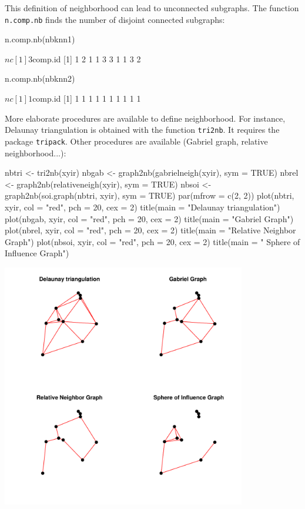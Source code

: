 \documentclass[a4paper]{article}
\begin{document}
This definition of neighborhood can lead to unconnected subgraphs. The function \texttt{n.comp.nb} finds the number of disjoint connected subgraphs:
\begin{Schunk}
\begin{Sinput}
 n.comp.nb(nbknn1)
\end{Sinput}
\begin{Soutput}
$nc
[1] 3

$comp.id
 [1] 1 2 1 1 3 3 1 1 3 2
\end{Soutput}
\begin{Sinput}
 n.comp.nb(nbknn2)
\end{Sinput}
\begin{Soutput}
$nc
[1] 1

$comp.id
 [1] 1 1 1 1 1 1 1 1 1 1
\end{Soutput}
\end{Schunk}

More elaborate procedures are available to define neighborhood. For instance, Delaunay triangulation is obtained with the function \texttt{tri2nb}. It requires the package \texttt{tripack}. Other procedures are available (Gabriel graph, relative neighborhood...):
\begin{Schunk}
\begin{Sinput}
 nbtri <- tri2nb(xyir)
 nbgab <- graph2nb(gabrielneigh(xyir), sym = TRUE)
 nbrel <- graph2nb(relativeneigh(xyir), sym = TRUE)
 nbsoi <- graph2nb(soi.graph(nbtri, xyir), sym = TRUE)
 par(mfrow = c(2, 2))
 plot(nbtri, xyir, col = "red", pch = 20, cex = 2)
 title(main = "Delaunay triangulation")
 plot(nbgab, xyir, col = "red", pch = 20, cex = 2)
 title(main = "Gabriel Graph")
 plot(nbrel, xyir, col = "red", pch = 20, cex = 2)
 title(main = "Relative Neighbor Graph")
 plot(nbsoi, xyir, col = "red", pch = 20, cex = 2)
 title(main = " Sphere of Influence Graph")
\end{Sinput}
\end{Schunk}

\begin{center}
\includegraphics[width=0.8\textwidth,keepaspectratio]{figs/tutorial-ni13}
\end{center}
\end{document}
